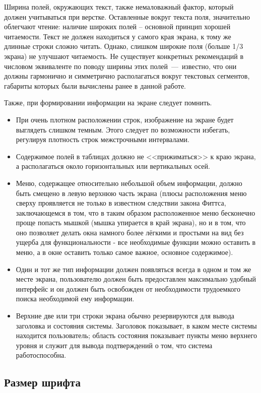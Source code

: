 \documentclass[14pt]{extarticle}
\begin{document}
Ширина полей, окружающих текст, также немаловажный фактор, который должен учитываться при верстке. Оставленные вокруг текста поля, значительно облегчают чтение: наличие широких полей – основной принцип хорошей читаемости. Текст не должен находиться у самого края экрана, к тому же длинные строки сложно читать. Однако, слишком широкие поля (больше 1/3 экрана) не улучшают читаемость. Не существует конкретных рекомендаций в числовом эквиваленте по поводу ширины этих полей~---~известно, что они должны гармонично и симметрично располагаться вокруг текстовых сегментов, габариты которых были вычислены ранее в данной работе.

Также, при формировании информации на экране следует помнить.

\begin{itemize}
	\item При очень плотном расположении строк, изображение на экране будет выглядеть слишком темным. Этого следует по возможности избегать, регулируя плотность строк межстрочными интервалами.
	\item Содержимое полей в таблицах должно не <<прижиматься>> к краю экрана, а располагаться около горизонтальных или вертикальных осей.
	\item Меню, содержащее относительно небольшой объем информации, должно быть смещено в левую верхнюю часть экрана (плюсы расположения меню сверху проявляется не только в известном следствии закона Фиттса, заключающемся в том, что в таким образом расположенное меню бесконечно проще попасть мышкой (мышка упирается в край экрана), но и в том, что оно позволяет делать окна намного более лёгкими и простыми на вид без ущерба для функциональности - все необходимые функции можно оставить в меню, а в окне оставить только самое важное, основное содержимое).
	\item Один и тот же тип информации должен появляться всегда в одном и том же месте экрана, пользователю должен быть предоставлен максимально удобный интерфейс и он должен быть освобожден от необходимости трудоемкого поиска необходимой ему информации.
	\item Верхние две или три строки экрана обычно резервируются для вывода заголовка и состояния системы. Заголовок показывает, в каком месте системы находится пользователь; область состояния показывает пункты меню верхнего уровня и служит для вывода подтверждений о том, что система работоспособна.

\end{itemize}

\subsection{Размер шрифта}
\end{document}
